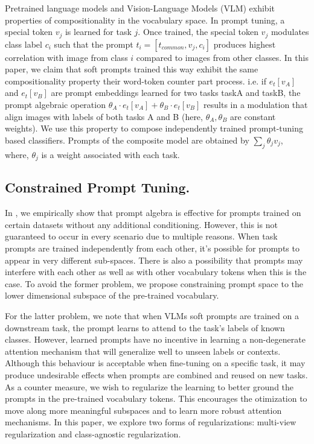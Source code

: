 \documentclass[10pt,twocolumn,letterpaper]{article}
\begin{document}
 
Pretrained language models and Vision-Language Models (VLM) exhibit properties of compositionality in the vocabulary space. In prompt tuning, a special token $v_j$ is learned for task $j$. Once trained, the special token $v_j$ modulates class label $c_i$ such that the prompt $t_i = [ t_{common} , v_j  , c_i ]$ produces highest correlation with image from class $i$ compared to images from other classes.  In this paper, we claim that soft prompts trained this way exhibit the same compositionality property their word-token counter part process.  i.e. if $e_t[v_A]$ and $e_t[v_B]$ are prompt embeddings learned for two tasks taskA and taskB, the prompt algebraic operation $\theta_A \cdot e_t[v_A]+ \theta_B \cdot e_t[v_B]$  results in a modulation that align images with labels of both tasks A and B (here, $\theta_A, \theta_B$ are constant weights). We use this property to compose independently trained prompt-tuning based classifiers. Prompts of the composite model are obtained by $\sum_{j} \theta_j  v_j $, where, $\theta_j$ is a weight associated with each task.





\subsection{Constrained Prompt Tuning.} In , we empirically show that prompt algebra is effective for prompts trained on certain datasets without any additional conditioning. However, this is not guaranteed to occur in every scenario due to multiple reasons. When task prompts are trained independently from each other, it's possible for prompts to appear in very different sub-spaces. There is also a possibility that prompts may interfere with each other as well as with other vocabulary tokens when this is the case. To avoid the former problem, we propose constraining prompt space to the lower dimensional subspace of the pre-trained vocabulary.

For the latter problem, we note that when VLMs soft prompts are trained on a downstream task, the prompt learns to attend to the task's labels of known classes. However, learned prompts have no incentive in learning a non-degenerate attention mechanism that will generalize well to unseen labels or contexts. Although this behaviour is acceptable when fine-tuning on a specific task, it may produce undesirable effects when prompts are combined and reused on new tasks. As a counter measure, we wish to regularize the learning to better ground the prompts in the pre-trained vocabulary tokens. This encourages the otimization to move along more meaningful subspaces and to learn more robust attention mechanisms. In this paper, we explore two forms of regularizations: multi-view regularization and class-agnostic regularization.\\
\end{document}
